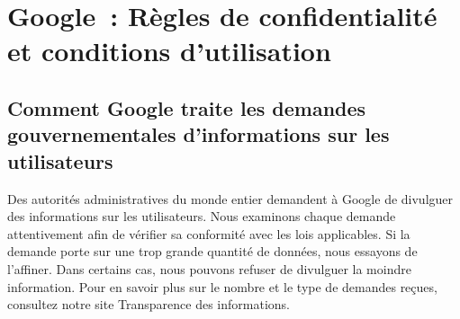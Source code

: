 \section{Google : Règles de confidentialité et conditions d'utilisation}

\subsection{Comment Google traite les demandes gouvernementales d'informations sur les utilisateurs}

Des autorités administratives du monde entier demandent à Google de divulguer des informations sur les utilisateurs. Nous examinons chaque demande attentivement afin de vérifier sa conformité avec les lois applicables. Si la demande porte sur une trop grande quantité de données, nous essayons de l'affiner. Dans certains cas, nous pouvons refuser de divulguer la moindre information. Pour en savoir plus sur le nombre et le type de demandes reçues, consultez notre site Transparence des informations.
